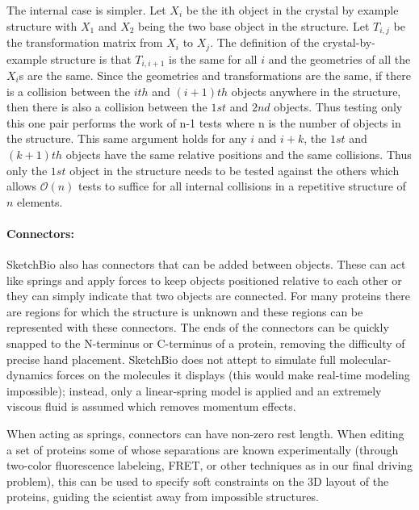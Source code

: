 \documentclass[twocolumn]{bmcart}%
\begin{document}
The internal case is simpler.  Let $X_i$ be the ith object in the crystal by example structure with $X_1$ and $X_2$ being the two base object in the structure.
Let $T_{i,j}$ be the transformation matrix from $X_i$ to $X_j$.
The definition of the crystal-by-example structure is that $T_{i,i+1}$ is the same for all $i$ and the geometries of all the $X_i$s are the same.
Since the geometries and transformations are the same, if there is a collision between the $ith$ and $(i+1)th$ objects anywhere in the structure, then there is also a collision between the $1st$ and $2nd$ objects.
Thus testing only this one pair performs the work of n-1 tests where n is the number of objects in the structure.
This same argument holds for any $i$ and $i+k$, the $1st$ and $(k+1)th$ objects have the same relative positions and the same collisions.
Thus only the $1st$ object in the structure needs to be tested against the others which allows $\mathcal{O}(n)$ tests to suffice for all internal collisions in a repetitive structure of $n$ elements.


\paragraph*{Connectors:}
SketchBio also has connectors that can be added between objects.
These can act like springs and apply forces to keep objects positioned relative to each other or they can simply indicate that two objects are connected.
For many proteins there are regions for which the structure is unknown and these regions can be represented with these connectors.
The ends of the connectors can be quickly snapped to the N-terminus or C-terminus of a protein, removing the difficulty of precise hand placement.
SketchBio does not attept to simulate full molecular-dynamics forces on the molecules it displays (this would make real-time modeling impossible); instead, only a linear-spring model is applied and an extremely viscous fluid is assumed which removes momentum effects.

When acting as springs, connectors can have non-zero rest length.
When editing a set of proteins some of whose separations are known experimentally (through two-color fluorescence labeleing, FRET, or other techniques as in our final driving problem), this can be used to specify soft constraints on the 3D layout of the proteins, guiding the scientist away from impossible structures.
\end{document}
